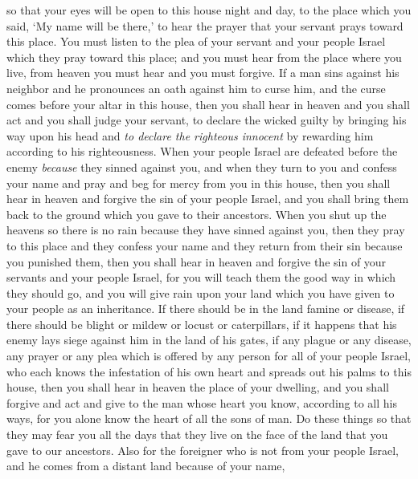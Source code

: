 \begin{biblechapter}
\verse so that your eyes will be open to this house night and day, to the place which you said, ‘My name will be there,’ to hear the prayer that your servant prays toward this place.
\verse You must listen to the plea of your servant and your people Israel which they pray toward this place; and you must hear from the place where you live, from heaven you must hear and you must forgive.
\verse If a man sins against his neighbor and he pronounces an oath against him to curse him, and the curse comes before your altar in this house,
\verse then you shall hear in heaven and you shall act and you shall judge your servant, to declare the wicked guilty by bringing his way upon his head and \textit{to declare the righteous innocent} by rewarding him according to his righteousness.
\verse When your people Israel are defeated before the enemy \textit{because} they sinned against you, and when they turn to you and confess your name and pray and beg for mercy from you in this house,
\verse then you shall hear in heaven and forgive the sin of your people Israel, and you shall bring them back to the ground which you gave to their ancestors.
\verse When you shut up the heavens so there is no rain because they have sinned against you, then they pray to this place and they confess your name and they return from their sin because you punished them,
\verse then you shall hear in heaven and forgive the sin of your servants and your people Israel, for you will teach them the good way in which they should go, and you will give rain upon your land which you have given to your people as an inheritance.
\verse If there should be in the land famine or disease, if there should be blight or mildew or locust or caterpillars, if it happens that his enemy lays siege against him in the land of his gates, if any plague or any disease,
\verse any prayer or any plea which is offered by any person for all of your people Israel, who each knows the infestation of his own heart and spreads out his palms to this house,
\verse then you shall hear in heaven the place of your dwelling, and you shall forgive and act and give to the man whose heart you know, according to all his ways, for you alone know the heart of all the sons of man.
\verse Do these things so that they may fear you all the days that they live on the face of the land that you gave to our ancestors.
\verse Also for the foreigner who is not from your people Israel, and he comes from a distant land because of your name,

\end{biblechapter}
